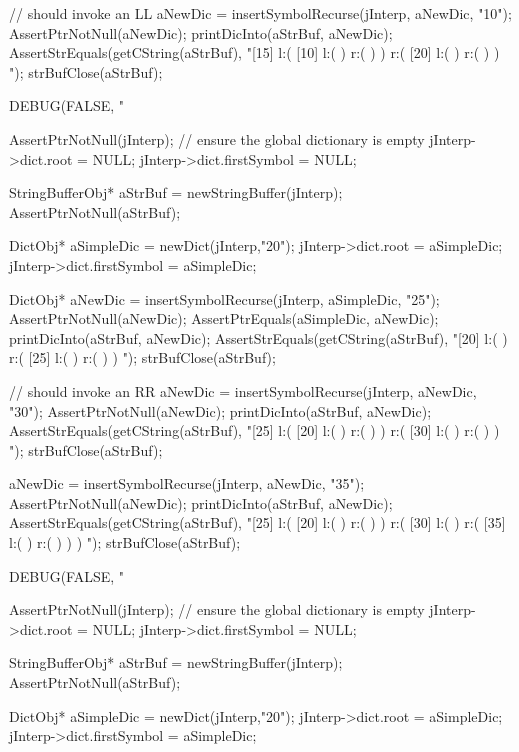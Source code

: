   // should invoke an LL
  aNewDic = insertSymbolRecurse(jInterp, aNewDic, "10");
  AssertPtrNotNull(aNewDic);
  printDicInto(aStrBuf, aNewDic);
  AssertStrEquals(getCString(aStrBuf),
  "[15] l:( [10] l:(  ) r:(  )  ) r:( [20] l:(  ) r:(  )  ) ");
  strBufClose(aStrBuf);
\stopCTest
\stopTestCase

\startCTest
  DEBUG(FALSE, "\n%

  AssertPtrNotNull(jInterp);
  // ensure the global dictionary is empty
  jInterp->dict.root        = NULL;
  jInterp->dict.firstSymbol = NULL;

  StringBufferObj* aStrBuf = newStringBuffer(jInterp);
  AssertPtrNotNull(aStrBuf);
  
  DictObj* aSimpleDic = newDict(jInterp,"20");
  jInterp->dict.root        = aSimpleDic;
  jInterp->dict.firstSymbol = aSimpleDic;

  DictObj* aNewDic = insertSymbolRecurse(jInterp, aSimpleDic, "25");
  AssertPtrNotNull(aNewDic);
  AssertPtrEquals(aSimpleDic, aNewDic);
  printDicInto(aStrBuf, aNewDic);
  AssertStrEquals(getCString(aStrBuf),
  "[20] l:(  ) r:( [25] l:(  ) r:(  )  ) ");
  strBufClose(aStrBuf);
  
  // should invoke an RR
  aNewDic = insertSymbolRecurse(jInterp, aNewDic, "30");
  AssertPtrNotNull(aNewDic);
  printDicInto(aStrBuf, aNewDic);
  AssertStrEquals(getCString(aStrBuf),
  "[25] l:( [20] l:(  ) r:(  )  ) r:( [30] l:(  ) r:(  )  ) ");
  strBufClose(aStrBuf);
  
  aNewDic = insertSymbolRecurse(jInterp, aNewDic, "35");
  AssertPtrNotNull(aNewDic);
  printDicInto(aStrBuf, aNewDic);
  AssertStrEquals(getCString(aStrBuf),
  "[25] l:( [20] l:(  ) r:(  )  ) r:( [30] l:(  ) r:( [35] l:(  ) r:(  )  )  ) ");
  strBufClose(aStrBuf);
\stopCTest
\stopTestCase

\startCTest
  DEBUG(FALSE, "\n%

  AssertPtrNotNull(jInterp);
  // ensure the global dictionary is empty
  jInterp->dict.root        = NULL;
  jInterp->dict.firstSymbol = NULL;

  StringBufferObj* aStrBuf = newStringBuffer(jInterp);
  AssertPtrNotNull(aStrBuf);
  
  DictObj* aSimpleDic = newDict(jInterp,"20");
  jInterp->dict.root        = aSimpleDic;
  jInterp->dict.firstSymbol = aSimpleDic;

